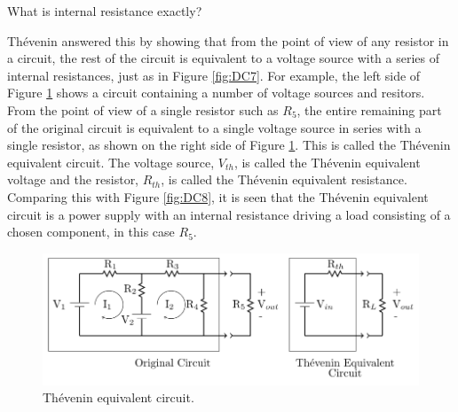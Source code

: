 \begin{qst}
    What is internal resistance exactly?
\end{qst}

Th\'{e}venin answered this by showing that from the point of view of any resistor in a circuit, the rest of the circuit is equivalent to a voltage source with a series of internal resistances, just as in Figure \ref{fig:DC7}. For example, the left side of Figure \ref{fig:DC9} shows a circuit containing a number of voltage sources and resitors. From the point of view of a single resistor such as $R_5$, the entire remaining part of the original circuit is equivalent to a single voltage source in series with a single resistor, as shown on the right side of Figure \ref{fig:DC9}. This is called the Th\'{e}venin equivalent circuit. The voltage source, $V_{th}$, is called the Th\'{e}venin equivalent voltage and the resistor, $R_{th}$, is called the Th\'{e}venin equivalent resistance. Comparing this with Figure \ref{fig:DC8}, it is seen that the Th\'{e}venin equivalent circuit is a power supply with an internal resistance driving a load consisting of a chosen component, in this case $R_5$.

\begin{figure}[H]
    \centering
    \includegraphics[scale = 0.8]{Images/DC9.PNG}
    \caption{Th\'{e}venin equivalent circuit.}
    \label{fig:DC9}
\end{figure}

